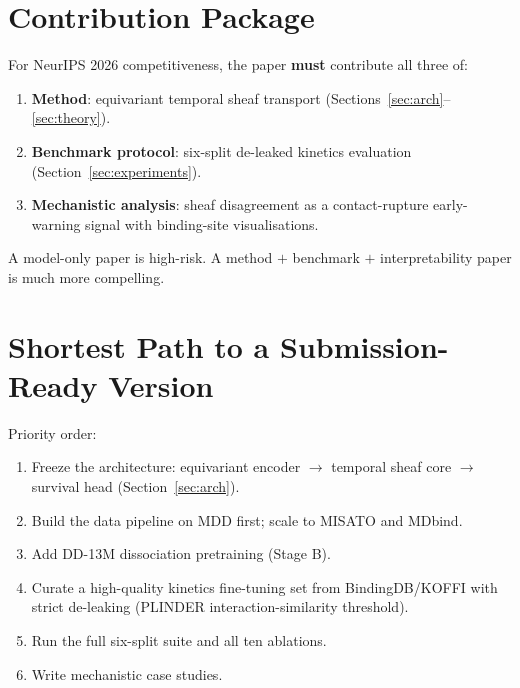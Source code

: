 \documentclass[12pt,a4paper]{article}
\begin{document}
\section{Contribution Package}
\label{sec:contributions}

\begin{claimbox}
For NeurIPS 2026 competitiveness, the paper \textbf{must} contribute all
three of:
\begin{enumerate}[noitemsep,label=\arabic*.]
  \item \textbf{Method}: equivariant temporal sheaf transport
        (Sections~\ref{sec:arch}--\ref{sec:theory}).
  \item \textbf{Benchmark protocol}: six-split de-leaked kinetics
        evaluation (Section~\ref{sec:experiments}).
  \item \textbf{Mechanistic analysis}: sheaf disagreement as a
        contact-rupture early-warning signal with binding-site
        visualisations.
\end{enumerate}
A model-only paper is high-risk.
A method $+$ benchmark $+$ interpretability paper is much more compelling.
\end{claimbox}

\section{Shortest Path to a Submission-Ready Version}
\label{sec:roadmap}

Priority order:
\begin{enumerate}
  \item Freeze the architecture: equivariant encoder $\to$ temporal sheaf
        core $\to$ survival head (Section~\ref{sec:arch}).
  \item Build the data pipeline on MDD first; scale to MISATO and MDbind.
  \item Add DD-13M dissociation pretraining (Stage B).
  \item Curate a high-quality kinetics fine-tuning set from
        BindingDB/KOFFI with strict de-leaking (PLINDER
        interaction-similarity threshold).
  \item Run the full six-split suite and all ten ablations.
  \item Write mechanistic case studies.
\end{enumerate}

\clearpage

\end{document}

